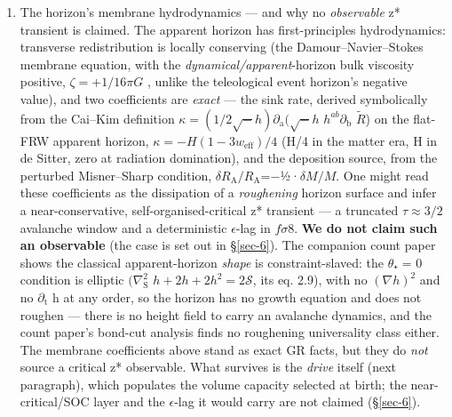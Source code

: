 \documentclass[aps,prd,preprint,nofootinbib,superscriptaddress]{revtex4-2}
\providecommand{\tightlist}{\setlength{\itemsep}{0pt}\setlength{\parskip}{0pt}}
\begin{document}
\begin{enumerate}
\def\labelenumi{(\roman{enumi})}
\setcounter{enumi}{3}
\tightlist
\item
  The horizon's membrane hydrodynamics --- and why no \emph{observable}
  z* transient is claimed. The apparent horizon has first-principles
  hydrodynamics: transverse redistribution is locally conserving (the
  Damour--Navier--Stokes membrane equation, with the
  \emph{dynamical/apparent}-horizon bulk viscosity positive,
  \(\zeta  = +1/16\pi G\) \cite{Gourgoulhon:2005ng}, unlike the
  teleological event horizon's negative value), and two coefficients are
  \emph{exact} --- the sink rate, derived symbolically from the Cai--Kim
  definition \(\kappa  = (1/2\surd -h)\partial _{\mathrm{a}}(\surd -h\)
  \(h^{ab}\partial _{\mathrm{b}}\) \(\tilde{R}\)) on the flat-FRW
  apparent horizon, \(\kappa  = -H(1 - 3w_{\mathrm{eff}})/4\) (H/4 in
  the matter era, H in de Sitter, zero at radiation domination), and the
  deposition source, from the perturbed Misner--Sharp condition,
  \(\delta R_{\mathrm{A}}/R_{\mathrm{A}}\)=−½·\(\delta M/M\). One might
  read these coefficients as the dissipation of a \emph{roughening}
  horizon surface and infer a near-conservative, self-organised-critical
  z* transient --- a truncated \(\tau  \approx  3/2\) avalanche window
  and a deterministic \(\epsilon\)-lag in \(f\sigma 8\). \textbf{We do
  not claim such an observable} (the case is set out in §\ref{sec-6}).
  The companion count paper \cite{Pandev:2026count} shows the classical
  apparent-horizon \emph{shape} is constraint-slaved: the \(\theta\)₊ =
  0 condition is elliptic \((\nabla ^{2}_{\mathrm{S}}\)
  \(h + 2h + 2h^{2} = 2\mathcal{S}\), its eq. 2.9), with no
  \((\nabla h)^{2}\) and no \(\partial _{\mathrm{t}}\) h at any order,
  so the horizon has no growth equation and does not roughen --- there
  is no height field to carry an avalanche dynamics, and the count
  paper's bond-cut analysis finds no roughening universality class
  either. The membrane coefficients above stand as exact GR facts, but
  they do \emph{not} source a critical z* observable. What survives is
  the \emph{drive} itself (next paragraph), which populates the volume
  capacity selected at birth; the near-critical/SOC layer and the
  \(\epsilon\)-lag it would carry are not claimed (§\ref{sec-6}).
\end{enumerate}
\end{document}
